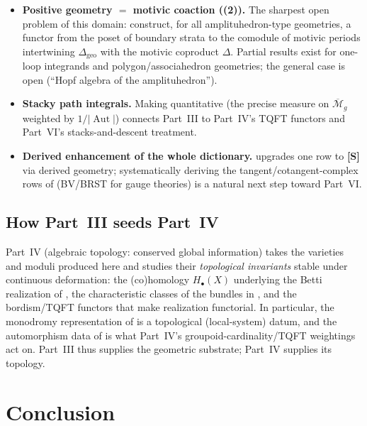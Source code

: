 \documentclass[12pt]{article}
\theoremstyle{definition}
\theoremstyle{remark}
\newcommand{\Aut}{\operatorname{Aut}}
\newcommand{\status}[1]{\textnormal{\textsf{\textbf{[#1]}}}}
\begin{document}
\begin{itemize}
  \item \textbf{Positive geometry $=$ motivic coaction ((2)).} The sharpest open
  problem of this domain: construct, for all amplituhedron-type geometries, a functor from the poset of
  boundary strata to the comodule of motivic periods intertwining $\Delta_{\mathrm{geo}}$ with the
  motivic coproduct $\Delta$. Partial results exist for one-loop integrands and polygon/associahedron
  geometries; the general case is open (``Hopf algebra of the amplituhedron'').
  \item \textbf{Stacky path integrals.} Making  quantitative (the precise measure on
  $\overline{\mathcal M}_g$ weighted by $1/|\!\Aut|$) connects Part~III to Part~IV's TQFT functors and
  Part~VI's stacks-and-descent treatment.
  \item \textbf{Derived enhancement of the whole dictionary.}  upgrades one row to
  \status{S} via derived geometry; systematically deriving the tangent/cotangent-complex rows of
   (BV/BRST for gauge theories) is a natural next step toward Part~VI.
\end{itemize}

\subsection{How Part~III seeds Part~IV}

Part~IV (algebraic topology: conserved global information) takes the varieties and moduli produced here
and studies their \emph{topological invariants} stable under continuous deformation: the (co)homology
$H_\bullet(X)$ underlying the Betti realization of , the characteristic classes of the
bundles in , and the bordism/TQFT functors that make realization functorial. In
particular, the monodromy representation of  is a topological (local-system) datum, and
the automorphism data of  is what Part~IV's groupoid-cardinality/TQFT weightings act on.
Part~III thus supplies the geometric substrate; Part~IV supplies its topology.

\section{Conclusion}
\label{sec:conclusion}
\end{document}
